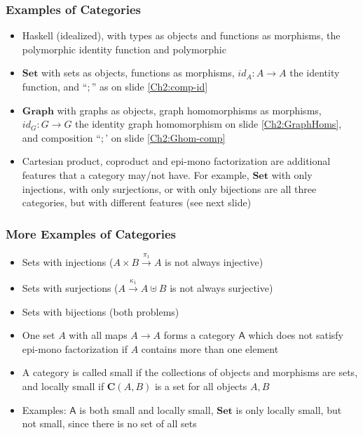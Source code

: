 \documentclass[handout]{beamer}
\newcommand{\bfsf}[1]{{\boldsymbol{#1}}}
\newcommand{\Set}{\bfsf{Set}}
\newcommand{\Gra}{\bfsf{Graph}}
\newcommand{\CC}{\bfsf{C}}
\begin{document}
\frame
  {   
    \frametitle{Examples of Categories}\label{Ch2:ExaCat}

 \begin{itemize}[<+->]
\item Haskell (idealized), with types as objects and functions as morphisms, 
the polymorphic identity function and polymorphic 
\item $\Set$ with sets as objects, functions as morphisms,
$id_A: A\to A$ the identity function, and ``$;$'' as on slide \ref{Ch2:comp-id}
\item $\Gra$ with graphs as objects, graph homomorphisms as morphisms,
$id_G: G\to G$ the identity graph homomorphism on slide \ref{Ch2:GraphHoms}, 
and composition ``$;$' on slide \ref{Ch2:Ghom-comp}
\item Cartesian product, coproduct and epi-mono factorization are additional
features that a category may/not have. For example, $\Set$ with only injections,
with only surjections, or with only bijections are all three categories, but
with different features (see next slide)
 \end{itemize}

 }

\frame
  {   
    \frametitle{More Examples of Categories}\label{Ch2:MoreExaCat}

 \begin{itemize}[<+->]
\item Sets with injections ($A\times B \stackrel{\pi_1}{\to} A$ is not always injective)
\item Sets with surjections ($ A\stackrel{\kappa_1}{\to} A\uplus B$ is not always surjective)
\item Sets with bijections (both problems)
\item One set $A$ with all maps $A\to A$ forms a category $\mathsf{A}$
which does not satisfy epi-mono factorization if $A$ contains more than one element
\item A category is called small if the collections of objects and morphisms are sets, 
and locally small if $\CC(A,B)$ is a set for all objects $A,B$
\item Examples: $\mathsf{A}$ is both small and locally small, $\Set$ is only locally small,
but not small, since there is no set of all sets
 \end{itemize}
 }
\end{document}
